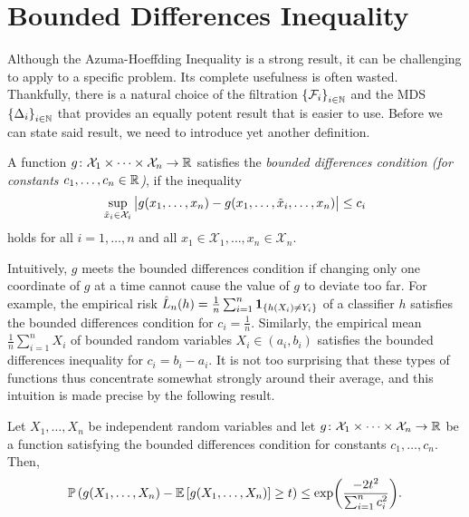 \section{Bounded Differences Inequality}

Although the Azuma-Hoeffding Inequality is a strong result, it can be challenging to apply to a specific problem. Its complete usefulness is often wasted. Thankfully, there is a natural choice of the filtration $\left\{\mathcal{F}_i\right\}_{i\in\mathbb{N}}$ and the MDS $\left\{\Delta_i\right\}_{i\in\mathbb{N}}$ that provides an equally potent result that is easier to use. Before we can state said result, we need to introduce yet another definition.

\begin{definition}
A function $g \colon \mathcal{X}_1 \times \dots \times \mathcal{X}_n \to \mathbb{R}$ satisfies the \emph{bounded differences condition (for constants $c_1, \dots, c_n \in \mathbb{R}$)}, if the inequality
\[
    \sup_{\tilde{x}_i \in \mathcal{X}_i} \big\lvert g(x_1, \dots, x_n) - g(x_1, \dots, \tilde{x}_i, \dots, x_n) \big\rvert \leq c_i
\]
holds for all $i = 1, \dots, n$ and all $x_1 \in \mathcal{X}_1, \dots, x_n \in \mathcal{X}_n$.
\end{definition}

Intuitively, $g$ meets the bounded differences condition if changing only one coordinate of $g$ at a time cannot cause the value of $g$ to deviate too far. For example, the empirical risk $\hat L_n(h) = \frac{1}{n} \sum_{i=1}^n \mathbf{1}_{\left\{h(X_i) \neq Y_i\right\}}$ of a classifier $h$ satisfies the bounded differences condition for $c_i = \frac{1}{n}$. Similarly, the empirical mean $\frac{1}{n} \sum_{i=1}^n X_i$ of bounded random variables $X_i \in (a_i, b_i)$ satisfies the bounded differences inequality for $c_i = b_i - a_i$. It is not too surprising that these types of functions thus concentrate somewhat strongly around their average, and this intuition is made precise by the following result.

\begin{theorem}
\label{thm: bounded differences inequality}
Let $X_1, \dots, X_n$ be independent random variables and let $g \colon \mathcal{X}_1 \times \dots \times \mathcal{X}_n \to \mathbb{R}$ be a function satisfying the bounded differences condition for constants $c_1, \dots, c_n$. Then,
\[
    \mathbb{P}\left(g(X_1, \dots, X_n) - \mathbb{E}\left[g(X_1, \dots, X_n)\right] \geq t \right) \leq \exp(\frac{-2t^2}{\sum_{i=1}^n c_i^2}).
\]
\end{theorem}

